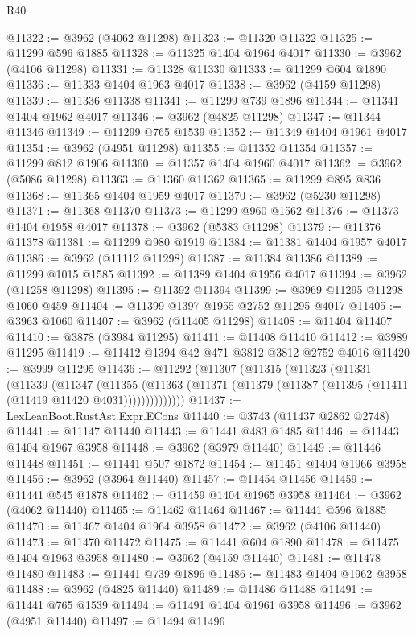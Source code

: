 \begin{lexlean}{R40}
\begin{coremodule}
@11322 := @3962 (@4062 @11298)
@11323 := @11320 @11322
@11325 := @11299 @596 @1885
@11328 := @11325 @1404 @1964 @4017
@11330 := @3962 (@4106 @11298)
@11331 := @11328 @11330
@11333 := @11299 @604 @1890
@11336 := @11333 @1404 @1963 @4017
@11338 := @3962 (@4159 @11298)
@11339 := @11336 @11338
@11341 := @11299 @739 @1896
@11344 := @11341 @1404 @1962 @4017
@11346 := @3962 (@4825 @11298)
@11347 := @11344 @11346
@11349 := @11299 @765 @1539
@11352 := @11349 @1404 @1961 @4017
@11354 := @3962 (@4951 @11298)
@11355 := @11352 @11354
@11357 := @11299 @812 @1906
@11360 := @11357 @1404 @1960 @4017
@11362 := @3962 (@5086 @11298)
@11363 := @11360 @11362
@11365 := @11299 @895 @836
@11368 := @11365 @1404 @1959 @4017
@11370 := @3962 (@5230 @11298)
@11371 := @11368 @11370
@11373 := @11299 @960 @1562
@11376 := @11373 @1404 @1958 @4017
@11378 := @3962 (@5383 @11298)
@11379 := @11376 @11378
@11381 := @11299 @980 @1919
@11384 := @11381 @1404 @1957 @4017
@11386 := @3962 (@11112 @11298)
@11387 := @11384 @11386
@11389 := @11299 @1015 @1585
@11392 := @11389 @1404 @1956 @4017
@11394 := @3962 (@11258 @11298)
@11395 := @11392 @11394
@11399 := @3969 @11295 @11298 @1060 @459
@11404 := @11399 @1397 @1955 @2752 @11295 @4017
@11405 := @3963 @1060
@11407 := @3962 (@11405 @11298)
@11408 := @11404 @11407
@11410 := @3878 (@3984 @11295)
@11411 := @11408 @11410
@11412 := @3989 @11295
@11419 := @11412 @1394 @42 @471 @3812 @3812 @2752 @4016
@11420 := @3999 @11295
@11436 := @11292
    (@11307
      (@11315
        (@11323
          (@11331
            (@11339
              (@11347
                (@11355
                  (@11363 (@11371 (@11379 (@11387 (@11395 (@11411 (@11419 @11420 @4031))))))))))))))
@11437 := LexLeanBoot.RustAst.Expr.ECons
@11440 := @3743 (@11437 @2862 @2748)
@11441 := @11147 @11440
@11443 := @11441 @483 @1485
@11446 := @11443 @1404 @1967 @3958
@11448 := @3962 (@3979 @11440)
@11449 := @11446 @11448
@11451 := @11441 @507 @1872
@11454 := @11451 @1404 @1966 @3958
@11456 := @3962 (@3964 @11440)
@11457 := @11454 @11456
@11459 := @11441 @545 @1878
@11462 := @11459 @1404 @1965 @3958
@11464 := @3962 (@4062 @11440)
@11465 := @11462 @11464
@11467 := @11441 @596 @1885
@11470 := @11467 @1404 @1964 @3958
@11472 := @3962 (@4106 @11440)
@11473 := @11470 @11472
@11475 := @11441 @604 @1890
@11478 := @11475 @1404 @1963 @3958
@11480 := @3962 (@4159 @11440)
@11481 := @11478 @11480
@11483 := @11441 @739 @1896
@11486 := @11483 @1404 @1962 @3958
@11488 := @3962 (@4825 @11440)
@11489 := @11486 @11488
@11491 := @11441 @765 @1539
@11494 := @11491 @1404 @1961 @3958
@11496 := @3962 (@4951 @11440)
@11497 := @11494 @11496

\end{coremodule}
\end{lexlean}

